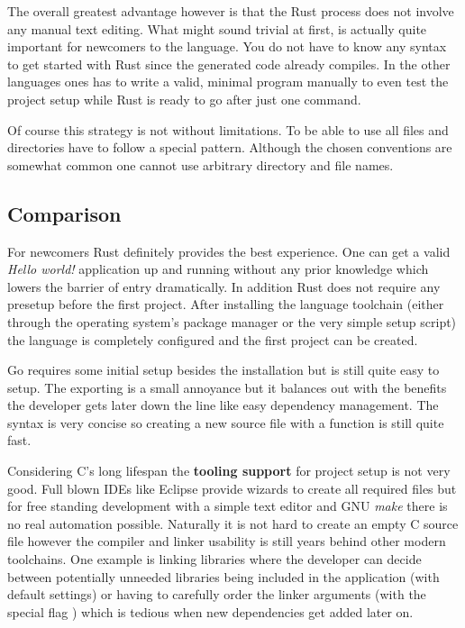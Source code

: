 The overall greatest advantage however is that the Rust process does not involve any manual text editing. What might sound trivial at first, is actually quite important for newcomers to the language. You do not have to know any syntax to get started with Rust since the generated code already compiles. In the other languages ones has to write a valid, minimal program manually to even test the project setup while Rust is ready to go after just one command.

Of course this strategy is not without limitations. To be able to use  all files and directories have to follow a special pattern. Although the chosen conventions are somewhat common one cannot use arbitrary directory and file names.

\subsection{Comparison}
\label{subsec:Implementation::Setup::Comparison}

For newcomers Rust definitely provides the best experience. One can get a valid \textit{Hello world!} application up and running without any prior knowledge which lowers the barrier of entry dramatically. In addition Rust does not require any presetup before the first project. After installing the language toolchain (either through the operating system's package manager or the very simple setup script) the language is completely configured and the first project can be created.

Go requires some initial setup besides the installation but is still quite easy to setup. The  exporting is a small annoyance but it balances out with the benefits the developer gets later down the line like easy dependency management. The syntax is very concise so creating a new source file with a  function is still quite fast.

Considering C's long lifespan the \textbf{tooling support} for project setup is not very good. Full blown IDEs like Eclipse provide wizards to create all required files but for free standing development with a simple text editor and GNU \textit{make} there is no real automation possible. Naturally it is not hard to create an empty C source file however the compiler and linker usability is still years behind other modern toolchains. One example is linking libraries where the developer can decide between potentially unneeded libraries being included in the application (with default settings) or having to carefully order the linker arguments (with the special flag ) which is tedious when new dependencies get added later on.

